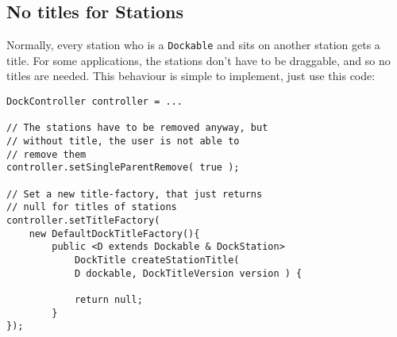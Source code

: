 \documentclass{article}
\begin{document}
\subsection{No titles for Stations}
Normally, every station who is a \verb!Dockable! and sits on another station gets a title. For some applications, the stations don't have to be draggable, and so no titles are needed. This behaviour is simple to implement, just use this code:
\begin{lstlisting}
DockController controller = ...

// The stations have to be removed anyway, but
// without title, the user is not able to
// remove them
controller.setSingleParentRemove( true );

// Set a new title-factory, that just returns 
// null for titles of stations
controller.setTitleFactory( 
	new DefaultDockTitleFactory(){
		public <D extends Dockable & DockStation> 
			DockTitle createStationTitle( 
			D dockable, DockTitleVersion version ) {
			
			return null;
		}
});
\end{lstlisting}
\end{document}
